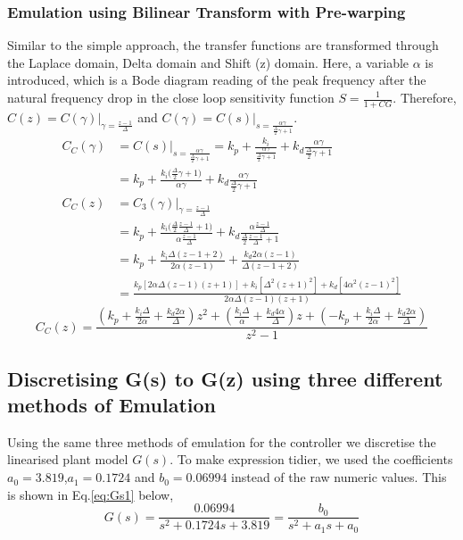 \documentclass[11pt]{article}
\begin{document}
\subsubsection{Emulation using Bilinear Transform with Pre-warping}
Similar to the simple approach, the transfer functions are transformed through the Laplace domain, Delta domain and Shift (z) domain. Here, a variable $\alpha$ is introduced, which is a Bode diagram reading of the peak frequency after the natural frequency drop in the close loop sensitivity function $S = \frac{1}{1 + CG}$. Therefore, $C(z) = C(\gamma)|_{\gamma = \frac{z - 1}{\Delta}}$ and $C(\gamma) = C(s)|_{s = \frac{\alpha \gamma}{\frac{\Delta}{2} \gamma + 1}}$.
\begin{align*}
    C_C(\gamma) &= C(s)|_{s = \frac{\alpha \gamma}{\frac{\Delta}{2} \gamma + 1}} = k_p + \frac{k_i}{\frac{\alpha \gamma}{\frac{\Delta}{2} \gamma + 1}} + k_d \frac{\alpha \gamma}{\frac{\Delta}{2} \gamma + 1}\\
    &= k_p + \frac{k_i \bigg( \frac{\Delta}{2} \gamma + 1 \bigg)}{\alpha \gamma} + k_d \frac{\alpha \gamma}{\frac{\Delta}{2} \gamma + 1}\\
    C_C(z) &= C_3(\gamma)|_{\gamma = \frac{z-1}{\Delta} }\\
    &= k_p + \frac{k_i \bigg( \frac{\Delta}{2} \frac{z-1}{\Delta} + 1 \bigg)}{\alpha \frac{z-1}{\Delta}} + k_d \frac{\alpha \frac{z-1}{\Delta}}{\frac{\Delta}{2} \frac{z-1}{\Delta} + 1}\\
    &= k_p + \frac{k_i \Delta (z -1 + 2)}{2 \alpha (z-1)} + \frac{k_d 2 \alpha (z-1)}{\Delta (z-1+2)}\\
    &= \frac{k_p [2\alpha \Delta (z-1)(z+1)] + k_i[{\Delta}^2 (z+1)^2] + k_d [4{\alpha}^2 (z-1)^2]}{2\alpha \Delta (z-1)(z+1)}
\end{align*}
\begin{equation}\label{eq:CCz}
    C_C(z)= \frac{(k_p + \frac{k_i \Delta}{2 \alpha} + \frac{k_d 2 \alpha}{\Delta})z^2 + (\frac{k_i \Delta}{\alpha} + \frac{k_d 4 \alpha}{\Delta})z + (-k_p + \frac{k_i \Delta}{2 \alpha} + \frac{k_d 2 \alpha}{\Delta})}{z^2-1}
\end{equation}
\subsection{Discretising G(s) to G(z) using three different methods of Emulation}
Using the same three methods of emulation for the controller we discretise the linearised plant model $G(s)$. To make expression tidier, we used the coefficients $a_0=3.819$,$a_1=0.1724$ and $b_0=0.06994$ instead of the raw numeric values. This is shown in Eq.\ref{eq:Gs1} below,
\begin{equation}\label{eq:Gs1}
    G(s) = \frac{0.06994}{s^2 + 0.1724s + 3.819} = \frac{b_0}{s^2 + a_1 s + a_0}
\end{equation}
\end{document}
